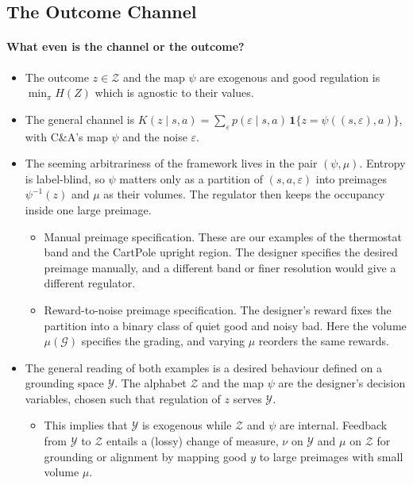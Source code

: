 \documentclass[10pt]{article}
\begin{document}
\subsection{The Outcome Channel}


\paragraph{What even is the channel or the outcome?}
\begin{itemize}
  \item The outcome $z \in \mathcal Z$ and the map $\psi$ are exogenous and good regulation is $\min_\pi H(Z)$ which is agnostic to their values.
  \item The general channel is $K(z \mid s,a) = \sum_\varepsilon p(\varepsilon \mid s,a)\,\mathbf 1\{z = \psi((s,\varepsilon),a)\}$, with C\&A's map $\psi$ and the noise $\varepsilon$.
  \item The seeming arbitrariness of the framework lives in the pair $(\psi, \mu)$. Entropy is label-blind, so $\psi$ matters only as a partition of $(s,a,\varepsilon)$ into preimages $\psi^{-1}(z)$ and $\mu$ as their volumes. The regulator then keeps the occupancy inside one large preimage.
  \begin{itemize}
    \item Manual preimage specification. These are our examples of the thermostat band and the CartPole upright region. The designer specifies the desired preimage manually, and a different band or finer resolution would give a different regulator.
    \item Reward-to-noise preimage specification. The designer's reward fixes the partition into a binary class of quiet good and noisy bad. Here the volume $\mu(\mathcal G)$ specifies the grading, and varying $\mu$ reorders the same rewards.
  \end{itemize}
  \item The general reading of both examples is a desired behaviour defined on a grounding space $\mathcal Y$. The alphabet $\mathcal Z$ and the map $\psi$ are the designer's decision variables, chosen such that regulation of $z$ serves $\mathcal Y$.
  \begin{itemize}
    \item This implies that $\mathcal Y$ is exogenous while $\mathcal Z$ and $\psi$ are internal. Feedback from $\mathcal Y$ to $\mathcal Z$ entails a (lossy) change of measure, $\nu$ on $\mathcal Y$ and $\mu$ on $\mathcal Z$ for grounding or alignment by mapping good $y$ to large preimages with small volume $\mu$.
  \end{itemize}
\end{itemize}
\end{document}
